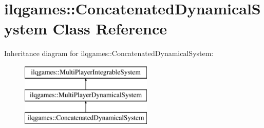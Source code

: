 \hypertarget{classilqgames_1_1_concatenated_dynamical_system}{}\section{ilqgames\+:\+:Concatenated\+Dynamical\+System Class Reference}
\label{classilqgames_1_1_concatenated_dynamical_system}
Inheritance diagram for ilqgames\+:\+:Concatenated\+Dynamical\+System\+:\begin{figure}[H]
\begin{center}
\leavevmode
\includegraphics[height=3.000000cm]{classilqgames_1_1_concatenated_dynamical_system}
\end{center}
\end{figure}
